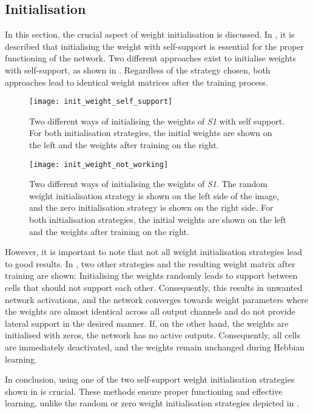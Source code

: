 \subsection{Initialisation}
In this section, the crucial aspect of weight initialisation is discussed.
In , it is described that initialising the weight with self-support is essential for the proper functioning of the network.
Two different approaches exist to initialise weights with self-support, as shown in .
Regardless of the strategy chosen, both approaches lead to identical weight matrices after the training process.
\begin{figure}[h]
    \centering
    \texttt{[image: init\_weight\_self\_support]}
    \caption[Weight initialisation with self-support]{Two different ways of initialising the weights of \emph{S1} with self support. For both initialisation strategies, the initial weights are shown on the left and the weights after training on the right.}
\end{figure}
\begin{figure}[h]
    \centering
    \texttt{[image: init\_weight\_not\_working]}
    \caption[Random weight initialisation]{Two different ways of initialising the weights of \emph{S1}. The random weight initialisation strategy is shown on the left side of the image, and the zero initialisation strategy is shown on the right side. For both initialisation strategies, the initial weights are shown on the left and the weights after training on the right.}
\end{figure}

However, it is important to note that not all weight initialisation strategies lead to good results. 
In , two other strategies and the resulting weight matrix after training are shown:
Initialising the weights randomly leads to support between cells that should not support each other.
Consequently, this results in unwanted network activations, and the network converges towards weight parameters where the weights are almost identical across all output channels and do not provide lateral support in the desired manner.
If, on the other hand, the weights are initialised with zeros, the network has no active outputs. Consequently, all cells are immediately deactivated, and the weights remain unchanged during Hebbian learning.

In conclusion, using one of the two self-support weight initialisation strategies shown in  is crucial. These methods ensure proper functioning and effective learning, unlike the random or zero weight initialisation strategies depicted in .

